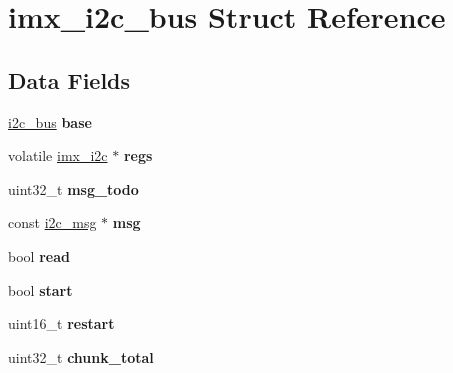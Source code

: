 \hypertarget{structimx__i2c__bus}{}\section{imx\+\_\+i2c\+\_\+bus Struct Reference}
\label{structimx__i2c__bus}
\subsection*{Data Fields}
\begin{DoxyCompactItemize}
\item 
\mbox{\label{structimx__i2c__bus_abeaad71b84c57b91ec1a10920bdc1828}} 
\mbox{\hyperlink{structi2c__bus}{i2c\+\_\+bus}} {\bfseries base}
\item 
\mbox{\label{structimx__i2c__bus_ad863b9f0a981316efc606e75a3301582}} 
volatile \mbox{\hyperlink{structimx__i2c}{imx\+\_\+i2c}} $\ast$ {\bfseries regs}
\item 
\mbox{\label{structimx__i2c__bus_a4a472c9ea0489d2207081c6fe4723a72}} 
uint32\+\_\+t {\bfseries msg\+\_\+todo}
\item 
\mbox{\label{structimx__i2c__bus_a35ea88214f0c59620abe4c7c89e6a5f1}} 
const \mbox{\hyperlink{structi2c__msg}{i2c\+\_\+msg}} $\ast$ {\bfseries msg}
\item 
\mbox{\label{structimx__i2c__bus_a58b27a4ecaff7d3029019092209e637f}} 
bool {\bfseries read}
\item 
\mbox{\label{structimx__i2c__bus_a082a3d4caf587052c2dfd31156747ead}} 
bool {\bfseries start}
\item 
\mbox{\label{structimx__i2c__bus_a82e4f0a1f88a89a7c739fb7dd40a457e}} 
uint16\+\_\+t {\bfseries restart}
\item 
\mbox{\label{structimx__i2c__bus_a9116260c9ce7829fab7873e2ffa704c9}} 
uint32\+\_\+t {\bfseries chunk\+\_\+total}
\item 
\mbox{\label{structimx__i2c__bus_a299d097cf2e4fc16e6c40cfdccba89aa}} 

\end{DoxyCompactItemize}

